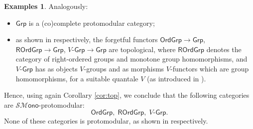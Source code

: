 \documentclass[10pt,a4paper]{amsart}
\theoremstyle{plain}
\theoremstyle{definition}
\newtheorem{examples}[subsection]{Examples}
\theoremstyle{remark}
\newcommand{\Grp}{\ensuremath{\mathsf{Grp}}}
\newcommand{\OrdGrp}{\ensuremath{\mathsf{OrdGrp}}}
\newcommand{\ROrdGrp}{\ensuremath{\mathsf{ROrdGrp}}}
\newcommand{\SMono}{\ensuremath{\mathscr{SM}\mathsf{ono}}}
\begin{document}
\begin{examples}\label{exe:Grp}
Analogously:
\begin{itemize}
\item $\Grp$ is a (co)complete protomodular category;
\item as shown in \cite{CM-FM, CM1, CM2} respectively, the forgetful functors $\OrdGrp\to\Grp$, $\ROrdGrp\to\Grp$, $V$-$\Grp\to\Grp$ are topological, where $\ROrdGrp$ denotes the category of right-ordered groups and monotone group homomorphisms, and $V\mbox{-}\Grp$ has as objects $V$-groups and as morphisms $V$-functors which are group homomorphisms, for a suitable quantale $V$ (as introduced in \cite{CM1}).
\end{itemize}
Hence, using again Corollary \ref{cor:top}, we conclude that the following categories are $\SMono$-pro\-to\-mo\-du\-lar:
\[\OrdGrp,\;\ROrdGrp,\;V\mbox{-}\Grp.\]
None of these categories is protomodular, as shown in \cite{CM-FM, CM1, CM2} respectively.
\end{examples}
\end{document}
